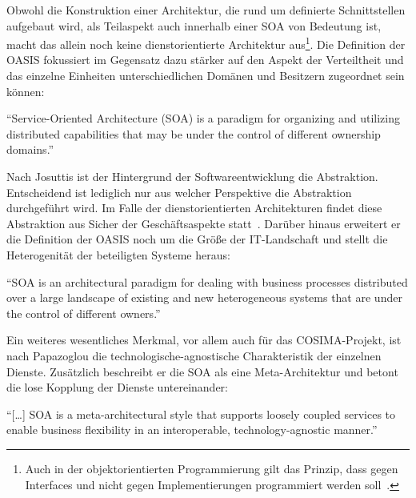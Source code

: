   Obwohl die Konstruktion einer Architektur, die rund um definierte Schnittstellen aufgebaut wird, als Teilaspekt auch innerhalb einer SOA von Bedeutung ist, macht das allein noch keine dienstorientierte Architektur aus\footnote{Auch in der objektorientierten Programmierung gilt das Prinzip, dass gegen Interfaces und nicht gegen Implementierungen programmiert werden soll~\citep[S. 18]{design_patterns}.}. Die Definition der OASIS fokussiert im Gegensatz dazu stärker auf den Aspekt der Verteiltheit und das einzelne Einheiten unterschiedlichen Domänen und Besitzern zugeordnet sein können:

\begin{definition}\label{def:soa_oasis_reference_model_}
  "`Service-Oriented Architecture (SOA) is a paradigm for organizing and utilizing distributed capabilities that may be under the control of different ownership domains."'~\emph{\citep[S. 8]{mackenzie2006rms}}
\end{definition}

  Nach Josuttis ist der Hintergrund der Softwareentwicklung die Abstraktion. Entscheidend ist lediglich nur aus welcher Perspektive die Abstraktion durchgeführt wird. Im Falle der dienstorientierten Architekturen findet diese Abstraktion aus Sicher der Geschäftsaspekte statt~\citep[S. 16]{soa_in_practice}. Darüber hinaus erweitert er die Definition der OASIS noch um die Größe der IT-Landschaft und stellt die Heterogenität der beteiligten Systeme heraus:

\begin{definition}\label{def:soa_josuttis_}
  "`SOA is an architectural paradigm for dealing with business processes distributed over a large landscape of existing and new heterogeneous systems that are under the control of different owners."'~\emph{\citep[S. 24]{soa_in_practice}}
\end{definition}

  Ein weiteres wesentliches Merkmal, vor allem auch für das COSIMA-Projekt, ist nach Papazoglou die technologische-agnostische Charakteristik der einzelnen Dienste. Zusätzlich beschreibt er die SOA als eine Meta-Architektur und betont die lose Kopplung der Dienste untereinander:

\begin{definition}\label{def:soa_papazoglou_}
  "`[\ldots] SOA is a meta-architectural style that supports loosely coupled services to enable business flexibility in an interoperable, technology-agnostic manner."'~\emph{\citep[S. 257]{web_services_principles_and_technology}}
\end{definition}

